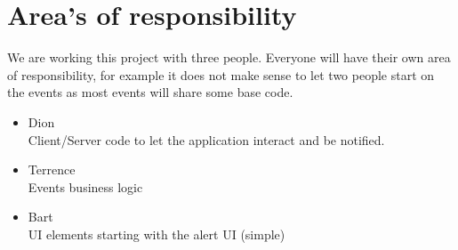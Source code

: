 \documentclass[]{article}
\begin{document}
\section{Area's of responsibility}
We are working this project with three people. Everyone will have their own area of responsibility, for example it does not make sense to let two people start on the events as most events will share some base code.


\begin{itemize}
	\item Dion\\
	      Client/Server code to let the application interact and be notified.
	\item Terrence\\
	      Events business logic
	\item Bart\\
	      UI elements starting with the alert UI (simple)
\end{itemize}
\end{document}
